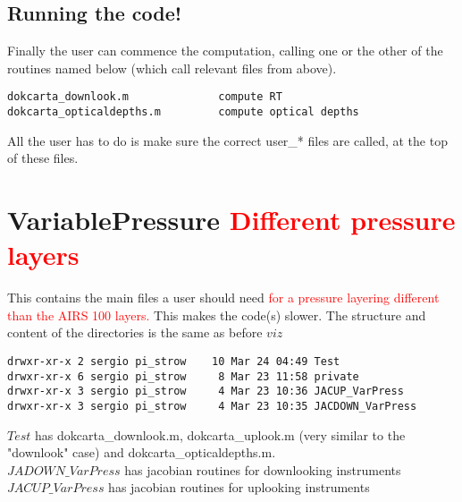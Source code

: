 \documentclass[12pt]{article}
\begin{document}
\subsection{Running the code!}
Finally the user can commence the computation, calling one or the other
of the routines named below (which call relevant files from above).
\begin{verbatim}
dokcarta_downlook.m              compute RT
dokcarta_opticaldepths.m         compute optical depths
\end{verbatim}
All the user has to do is make sure the correct user\_* files are called,
at the top of these files.

\section{VariablePressure \textcolor{red}{Different pressure layers}}
This contains the main files a user should need \textcolor{red}{for a 
pressure layering different than the AIRS 100 layers.} This makes the code(s)
slower. The structure and content of the directories is the same as before 
$viz$

\begin{verbatim}
drwxr-xr-x 2 sergio pi_strow    10 Mar 24 04:49 Test
drwxr-xr-x 6 sergio pi_strow     8 Mar 23 11:58 private
drwxr-xr-x 3 sergio pi_strow     4 Mar 23 10:36 JACUP_VarPress
drwxr-xr-x 3 sergio pi_strow     4 Mar 23 10:35 JACDOWN_VarPress
\end{verbatim}

\noindent $Test$ has dokcarta\_downlook.m, dokcarta\_uplook.m (very similar to 
the "downlook" case) and dokcarta\_opticaldepths.m.\\

\noindent $JADOWN\_VarPress$ has jacobian routines for downlooking 
instruments\\

\noindent $JACUP\_VarPress$ has jacobian routines for uplooking instruments\\
\end{document}
